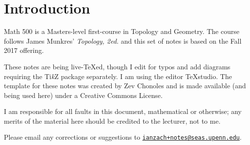 \documentclass[11pt]{article}
\author{%
	Notes by \notetaker}
\title{\coursetitle}
\date{\institution, \courseterm}
\makeatletter
\newcommand{\notetakersemail}{ianzach+notes@seas.upenn.edu}
\newcounter{lecture}       \setcounter{lecture}{0}
\theoremstyle{definition}
\makeatother
\begin{document}
	
	
	
	
	\maketitle
	\thispagestyle{empty}
	\setcounter{page}{-1}
	\vspace{0.3in}
	
	
	
	\begin{center}
		\begin{minipage}[t]{0.9\textwidth}
			\begin{multicols}{2}
				\tableofcontents
			\end{multicols}
		\end{minipage}
	\end{center}
	
	
	
	\newpage
	\thispdfpagelabel{-}
	\thispagestyle{empty}
	
	
	
	\section*{Introduction}
	Math 500 is a Masters-level first-course in Topology and Geometry.  The course follows James Munkres' \textit{Topology, 2ed.} and this set of notes is based on the Fall 2017 offering.
	
	These notes are being live-TeXed, though I edit for typos and add diagrams requiring the Ti\textit{k}Z package separately. I am using the editor TeXstudio.  The template for these notes was created by Zev Chonoles and is made available (and being used here) under a Creative Commons License. 
	
	I am responsible for all faults in this document, mathematical or otherwise; any merits of the material here should be credited to the lecturer, not to me.
	
	Please email any corrections or suggestions to \expandafter\href{mailto:\notetakersemail}{\texttt{\notetakersemail}}.
	
\end{document}
